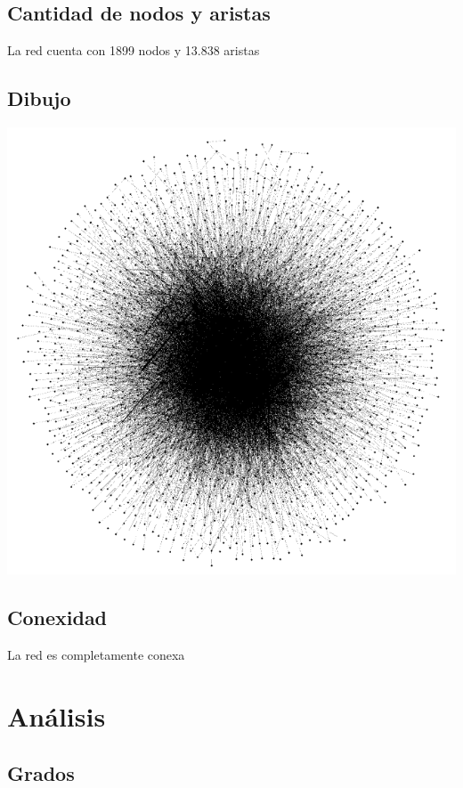 \documentclass[12pt]{article}
\begin{document}
\subsection{Cantidad de nodos y aristas}
La red cuenta con 1899 nodos y 13.838 aristas

\subsection{Dibujo}
\begin{center}
    \includegraphics[scale=0.5]{images/dibujo_red.png}
\end{center}

\subsection{Conexidad}
La red es completamente conexa
\section{Análisis}

\subsection{Grados}
\end{document}
